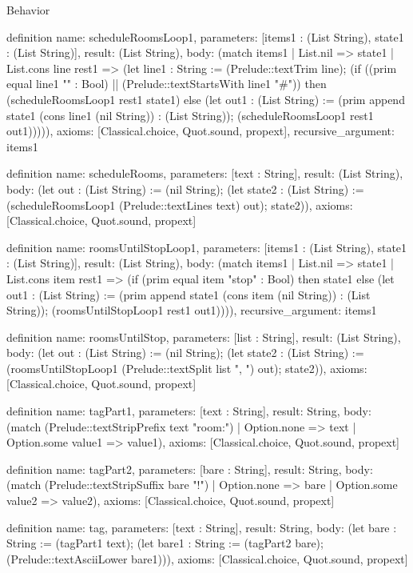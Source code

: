 \begin{lexlean}{Behavior}
\begin{semanticmodule}
definition{
  name: scheduleRoomsLoop1,
  parameters: [items1 : (List String), state1 : (List String)],
  result: (List String),
  body: (match items1
    | List.nil => state1
    | List.cons line rest1 => (let line1 : String := (Prelude::textTrim line); (if ((prim equal line1 "" : Bool) || (Prelude::textStartsWith line1 "#")) then (scheduleRoomsLoop1 rest1 state1) else (let out1 : (List String) := (prim append state1 (cons line1 (nil String)) : (List String)); (scheduleRoomsLoop1 rest1 out1))))),
  axioms: [Classical.choice, Quot.sound, propext],
  recursive_argument: items1
}

definition{
  name: scheduleRooms,
  parameters: [text : String],
  result: (List String),
  body: (let out : (List String) := (nil String); (let state2 : (List String) := (scheduleRoomsLoop1 (Prelude::textLines text) out); state2)),
  axioms: [Classical.choice, Quot.sound, propext]
}

definition{
  name: roomsUntilStopLoop1,
  parameters: [items1 : (List String), state1 : (List String)],
  result: (List String),
  body: (match items1
    | List.nil => state1
    | List.cons item rest1 => (if (prim equal item "stop" : Bool) then state1 else (let out1 : (List String) := (prim append state1 (cons item (nil String)) : (List String)); (roomsUntilStopLoop1 rest1 out1)))),
  recursive_argument: items1
}

definition{
  name: roomsUntilStop,
  parameters: [list : String],
  result: (List String),
  body: (let out : (List String) := (nil String); (let state2 : (List String) := (roomsUntilStopLoop1 (Prelude::textSplit list ", ") out); state2)),
  axioms: [Classical.choice, Quot.sound, propext]
}

definition{
  name: tagPart1,
  parameters: [text : String],
  result: String,
  body: (match (Prelude::textStripPrefix text "room:")
    | Option.none => text
    | Option.some value1 => value1),
  axioms: [Classical.choice, Quot.sound, propext]
}

definition{
  name: tagPart2,
  parameters: [bare : String],
  result: String,
  body: (match (Prelude::textStripSuffix bare "!")
    | Option.none => bare
    | Option.some value2 => value2),
  axioms: [Classical.choice, Quot.sound, propext]
}

definition{
  name: tag,
  parameters: [text : String],
  result: String,
  body: (let bare : String := (tagPart1 text); (let bare1 : String := (tagPart2 bare); (Prelude::textAsciiLower bare1))),
  axioms: [Classical.choice, Quot.sound, propext]
}


\end{semanticmodule}
\end{lexlean}
